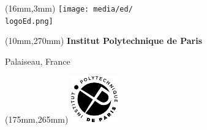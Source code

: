 \pagestyle{empty}

\begin{textblock*}{61mm}(16mm,3mm)
	\noindent\texttt{[image: media/ed/\\logoEd.png]}
\end{textblock*}



\begin{center}
\end{center}

\vspace*{0mm}

\begin{center}
\end{center}


\begin{textblock*}{161mm}(10mm,270mm)
\color{black}
{\bf\noindent Institut Polytechnique de Paris	         }

\noindent
{} Palaiseau, France 
\end{textblock*}

\begin{textblock*}{20mm}(175mm,265mm)
\includegraphics[width=20mm]{media/IPPARIS-petit}
\end{textblock*}

